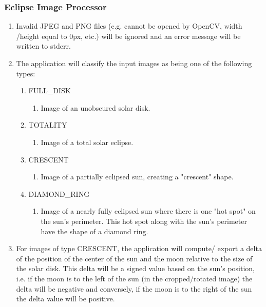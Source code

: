 \documentclass[10pt, onecolumn, draftclsnofoot, letterpaper, compsoc]{IEEEtran}
\begin{document}
\subsubsection{Eclipse Image Processor}
	\begin{enumerate}
		\item Invalid JPEG and PNG files (e.g. cannot be opened by OpenCV, width
		/height equal to 0px, etc.) will be ignored and an error message will
		 be written to stderr.

		\item The application will classify the input images as being one of
		the following types:
		\begin{enumerate}
			\item FULL\_DISK
			\begin{enumerate}
				\item Image of an unobscured solar disk.
			\end{enumerate}

			\item TOTALITY
			\begin{enumerate}
				\item Image of a total solar eclipse.
			\end{enumerate}

			\item CRESCENT
			\begin{enumerate}
				\item Image of a partially eclipsed sun, creating a "crescent" 
				shape.
			\end{enumerate}

			\item DIAMOND\_RING
			\begin{enumerate}
				\item Image of a nearly fully eclipsed sun where there is one 
				"hot spot" on the sun’s perimeter. This hot spot along with the 
				sun’s perimeter have the shape of a diamond ring.
			\end{enumerate}
		\end{enumerate}

		\item For images of type CRESCENT, the application will compute/
		export a delta of the position of the center of the sun and the 
		moon relative to the size of the solar disk. This delta will be a 
		signed value based on the sun’s position, i.e. if the moon is to 
		the left of the sun (in the cropped/rotated image) the delta will 
		be negative and conversely, if the moon is to the right of the sun 
		the delta value will be positive.


\end{enumerate}
\end{document}

